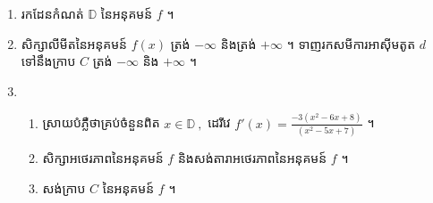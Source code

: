 \documentclass{officialexam}
\begin{document}
\begin{enumerate}[I]
		\begin{enumerate}[1]
			\item រកដែនកំណត់ $\mathbb{D}$ នៃអនុគមន៍ $f$ ។
			\item សិក្សាលីមីតនៃអនុគមន៍ $f(x)$ ត្រង់ $-\infty$ និងត្រង់ $+\infty$ ។ ទាញរកសមីការអាស៊ីមតូត $d$ ទៅនឹងក្រាប $C$ ត្រង់ $-\infty$ និង $+\infty$ ។
			\item \begin{enumerate}[k]
				\item ស្រាយបំភ្លឺថាគ្រប់ចំនួនពិត $x\in\mathbb{D}~,$ ដេរីវេ $f'(x)=\frac{-3\left(x^2-6x+8\right)}{\left(x^2-5x+7\right)}$ ។
				\item សិក្សាអថេរភាពនៃអនុគមន៍ $f$ និងសង់តារាអថេរភាពនៃអនុគមន៍ $f$ ។
				\item សង់ក្រាប $C$ នៃអនុគមន៍ $f$ ។
			\end{enumerate}
		\end{enumerate}
	\end{enumerate}
\end{document}
